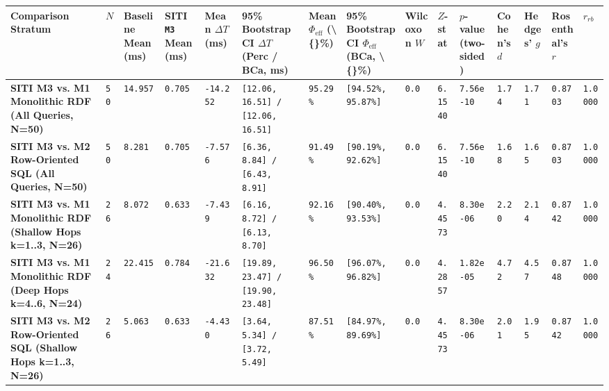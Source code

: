 \documentclass[10pt,a4paper]{article}
\begin{document}
{\scriptsize
\begin{longtable}{p{}p{}p{}p{}p{}p{}p{}p{}p{}p{}p{}p{}p{}p{}p{}}
\toprule
\textbf{Comparison Stratum} & \textbf{$N$} & \textbf{Baseline Mean (ms)} & \textbf{SITI \texttt{M3} Mean (ms)} & \textbf{Mean $\Delta T$ (ms)} & \textbf{95\% Bootstrap CI $\Delta T$ (Perc / BCa, ms)} & \textbf{Mean $\Phi_{\text{eff}}$ (\textbackslash\{\}\%)} & \textbf{95\% Bootstrap CI $\Phi_{\text{eff}}$ (BCa, \textbackslash\{\}\%)} & \textbf{Wilcoxon $W$} & \textbf{$Z$-stat} & \textbf{$p$-value (two-sided)} & \textbf{Cohen's $d$} & \textbf{Hedges' $g$} & \textbf{Rosenthal's $r$} & \textbf{$r_{rb}$} \\
\midrule
\endhead
\textbf{SITI M3 vs. M1 Monolithic RDF (All Queries, N=50)} & \texttt{50} & \texttt{14.957} & \texttt{0.705} & \texttt{-14.252} & \texttt{[12.06, 16.51] / [12.06, 16.51]} & \texttt{95.29\%} & \texttt{[94.52\%, 95.87\%]} & \texttt{0.0} & \texttt{6.1540} & \texttt{7.56e-10} & \texttt{1.74} & \texttt{1.71} & \texttt{0.8703} & \texttt{1.0000} \\
\textbf{SITI M3 vs. M2 Row-Oriented SQL (All Queries, N=50)} & \texttt{50} & \texttt{8.281} & \texttt{0.705} & \texttt{-7.576} & \texttt{[6.36, 8.84] / [6.43, 8.91]} & \texttt{91.49\%} & \texttt{[90.19\%, 92.62\%]} & \texttt{0.0} & \texttt{6.1540} & \texttt{7.56e-10} & \texttt{1.68} & \texttt{1.65} & \texttt{0.8703} & \texttt{1.0000} \\
\textbf{SITI M3 vs. M1 Monolithic RDF (Shallow Hops k=1..3, N=26)} & \texttt{26} & \texttt{8.072} & \texttt{0.633} & \texttt{-7.439} & \texttt{[6.16, 8.72] / [6.13, 8.70]} & \texttt{92.16\%} & \texttt{[90.40\%, 93.53\%]} & \texttt{0.0} & \texttt{4.4573} & \texttt{8.30e-06} & \texttt{2.20} & \texttt{2.14} & \texttt{0.8742} & \texttt{1.0000} \\
\textbf{SITI M3 vs. M1 Monolithic RDF (Deep Hops k=4..6, N=24)} & \texttt{24} & \texttt{22.415} & \texttt{0.784} & \texttt{-21.632} & \texttt{[19.89, 23.47] / [19.90, 23.48]} & \texttt{96.50\%} & \texttt{[96.07\%, 96.82\%]} & \texttt{0.0} & \texttt{4.2857} & \texttt{1.82e-05} & \texttt{4.72} & \texttt{4.57} & \texttt{0.8748} & \texttt{1.0000} \\
\textbf{SITI M3 vs. M2 Row-Oriented SQL (Shallow Hops k=1..3, N=26)} & \texttt{26} & \texttt{5.063} & \texttt{0.633} & \texttt{-4.430} & \texttt{[3.64, 5.34] / [3.72, 5.49]} & \texttt{87.51\%} & \texttt{[84.97\%, 89.69\%]} & \texttt{0.0} & \texttt{4.4573} & \texttt{8.30e-06} & \texttt{2.01} & \texttt{1.95} & \texttt{0.8742} & \texttt{1.0000} \\

\end{longtable}}
\end{document}
